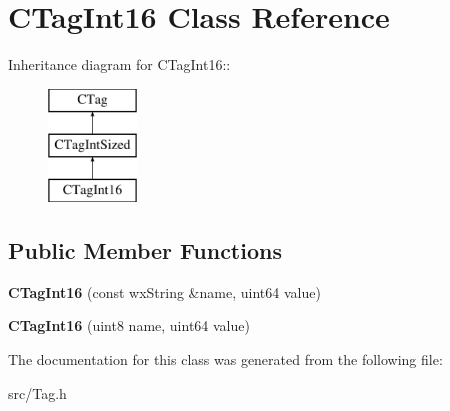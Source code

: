\section{CTagInt16 Class Reference}
\label{classCTagInt16}
Inheritance diagram for CTagInt16::\begin{figure}[H]
\begin{center}
\leavevmode
\includegraphics[height=3cm]{classCTagInt16}
\end{center}
\end{figure}
\subsection*{Public Member Functions}
\begin{DoxyCompactItemize}
\item 
{\bfseries CTagInt16} (const wxString \&name, uint64 value)\label{classCTagInt16_a1e2648bc6acc451e269fc4dd025e08fd}

\item 
{\bfseries CTagInt16} (uint8 name, uint64 value)\label{classCTagInt16_aca2515d76fca99da3ceec60f43c5e17b}

\end{DoxyCompactItemize}


The documentation for this class was generated from the following file:\begin{DoxyCompactItemize}
\item 
src/Tag.h\end{DoxyCompactItemize}
